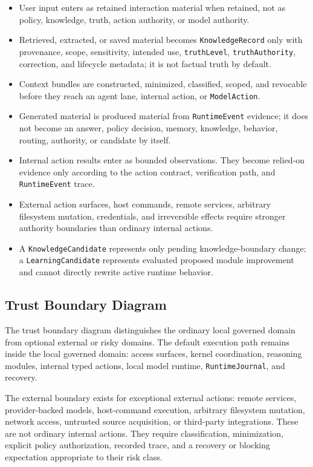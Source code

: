 \documentclass[11pt]{report}
\begin{document}
\begin{itemize}
	\item User input enters as retained interaction material when retained, not as policy, knowledge, truth, action authority, or model authority.
	\item Retrieved, extracted, or saved material becomes \texttt{KnowledgeRecord} only with provenance, scope, sensitivity, intended use, \texttt{truthLevel}, \texttt{truthAuthority}, correction, and lifecycle metadata; it is not factual truth by default.
	\item Context bundles are constructed, minimized, classified, scoped, and revocable before they reach an agent lane, internal action, or \texttt{ModelAction}.
	\item Generated material is produced material from \texttt{RuntimeEvent} evidence; it does not become an answer, policy decision, memory, knowledge, behavior, routing, authority, or candidate by itself.
	\item Internal action results enter as bounded observations. They become relied-on evidence only according to the action contract, verification path, and \texttt{RuntimeEvent} trace.
	\item External action surfaces, host commands, remote services, arbitrary filesystem mutation, credentials, and irreversible effects require stronger authority boundaries than ordinary internal actions.
	\item A \texttt{KnowledgeCandidate} represents only pending knowledge-boundary change; a \texttt{LearningCandidate} represents evaluated proposed module improvement and cannot directly rewrite active runtime behavior.
	\end{itemize}

\subsection{Trust Boundary Diagram}

The trust boundary diagram distinguishes the ordinary local governed domain from optional external or risky domains. The default execution path remains inside the local governed domain: access surfaces, kernel coordination, reasoning modules, internal typed actions, local model runtime, \texttt{RuntimeJournal}, and recovery.

The external boundary exists for exceptional external actions: remote services, provider-backed models, host-command execution, arbitrary filesystem mutation, network access, untrusted source acquisition, or third-party integrations. These are not ordinary internal actions. They require classification, minimization, explicit policy authorization, recorded trace, and a recovery or blocking expectation appropriate to their risk class.
\end{document}
